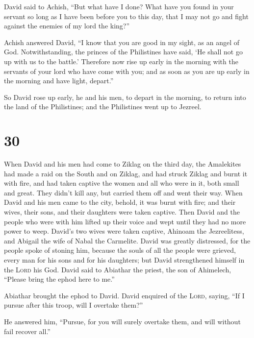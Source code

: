  David said to Achish, ``But what have I done? What have
you found in your servant so long as I have been before you to this day,
that I may not go and fight against the enemies of my lord the king?''

 Achish answered David, ``I know that you are good in my
sight, as an angel of God. Notwithstanding, the princes of the
Philistines have said, `He shall not go up with us to the battle.'
 Therefore now rise up early in the morning with the
servants of your lord who have come with you; and as soon as you are up
early in the morning and have light, depart.''

 So David rose up early, he and his men, to depart in the
morning, to return into the land of the Philistines; and the Philistines
went up to Jezreel.

\hypertarget{section-29}{%
\section{30}\label{section-29}}

 When David and his men had come to Ziklag on the third
day, the Amalekites had made a raid on the South and on Ziklag, and had
struck Ziklag and burnt it with fire,  and had taken
captive the women and all who were in it, both small and great. They
didn't kill any, but carried them off and went their way. 
When David and his men came to the city, behold, it was burnt with fire;
and their wives, their sons, and their daughters were taken captive.
 Then David and the people who were with him lifted up
their voice and wept until they had no more power to weep.
 David's two wives were taken captive, Ahinoam the
Jezreelitess, and Abigail the wife of Nabal the Carmelite.
 David was greatly distressed, for the people spoke of
stoning him, because the souls of all the people were grieved, every man
for his sons and for his daughters; but David strengthened himself in
the \textsc{Lord} his God.  David said to Abiathar the
priest, the son of Ahimelech, ``Please bring the ephod here to me.''

Abiathar brought the ephod to David.  David enquired of
the \textsc{Lord}, saying, ``If I pursue after this troop, will I
overtake them?''

He answered him, ``Pursue, for you will surely overtake them, and will
without fail recover all.''

